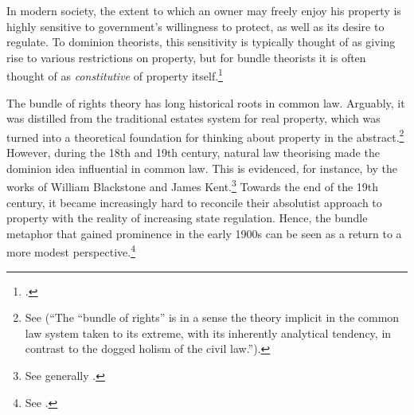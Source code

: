 In modern society, the extent to which an owner may freely enjoy his property is highly sensitive to government's willingness to protect, as well as its desire to regulate. To dominion theorists, this sensitivity is typically thought of as giving rise to various restrictions on property, but for bundle theorists it is often thought of as {\it constitutive} of property itself.\footcite[7]{chang12} 

The bundle of rights theory has long historical roots in common law. Arguably, it was distilled from the traditional estates system for real property, which was turned into a theoretical foundation for thinking about property in the abstract.\footnote{See \cite[7]{chang12} (``The ``bundle of rights'' is in a sense the theory implicit in the common law system taken to its extreme, with its inherently analytical tendency, in contrast to the dogged holism of the civil law.'').} However, during the 18th and 19th century, natural law theorising made the dominion idea influential in common law. This is evidenced, for instance, by the works of William Blackstone and James Kent.\footnote{See generally \cite{blackstone79b,kent27}.} Towards the end of the 19th century, it became increasingly hard to reconcile their absolutist approach to property with the reality of increasing state regulation. Hence, the bundle metaphor that gained prominence in the early 1900s can be seen as a return to a more modest perspective.\footnote{See \cite[195]{klein11}.}

